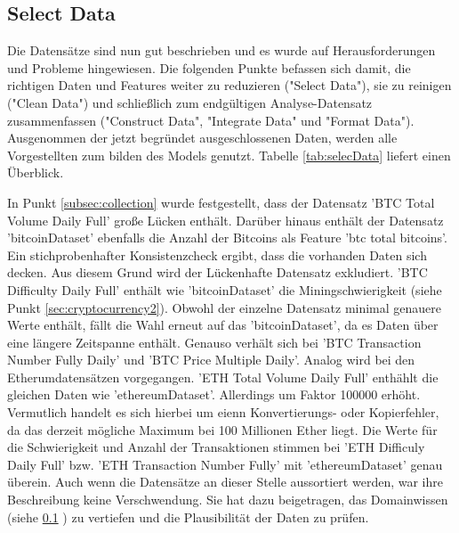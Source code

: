 \subsection{Select Data}
Die Datensätze sind nun gut beschrieben und es wurde auf Herausforderungen und Probleme hingewiesen. Die folgenden Punkte befassen sich damit, die richtigen Daten und Features weiter zu reduzieren ("Select Data"), sie zu reinigen ("Clean Data") und schließlich zum endgültigen Analyse-Datensatz zusammenfassen ("Construct Data", "Integrate Data" und "Format Data").
Ausgenommen der jetzt begründet ausgeschlossenen Daten, werden alle Vorgestellten zum bilden des Models genutzt. Tabelle \ref{tab:selecData} liefert einen Überblick.

In Punkt \ref{subsec:collection} wurde festgestellt, dass der Datensatz 'BTC \textunderscore Total \textunderscore Volume \textunderscore Daily \textunderscore Full' große Lücken enthält. Darüber hinaus enthält der Datensatz 'bitcoinDataset' ebenfalls die Anzahl der Bitcoins als Feature 'btc \textunderscore total \textunderscore bitcoins'. Ein stichprobenhafter Konsistenzcheck ergibt, dass die vorhanden Daten sich decken. Aus diesem Grund wird der Lückenhafte Datensatz exkludiert. 
'BTC \textunderscore Difficulty \textunderscore Daily \textunderscore Full' enthält wie 'bitcoinDataset' die Miningschwierigkeit (siehe Punkt \ref{sec:cryptocurrency2}). Obwohl der einzelne Datensatz minimal genauere Werte enthält, fällt die Wahl erneut auf das 'bitcoinDataset', da es Daten über eine längere Zeitspanne enthält. Genauso verhält sich bei 'BTC \textunderscore Transaction \textunderscore Number \textunderscore Fully \textunderscore Daily' und 'BTC \textunderscore Price \textunderscore Multiple \textunderscore Daily'. 
Analog wird bei den Etherumdatensätzen vorgegangen. 'ETH \textunderscore Total \textunderscore Volume \textunderscore Daily \textunderscore Full' enthählt die gleichen Daten wie 'ethereumDataset'. Allerdings um Faktor 100000 erhöht. Vermutlich handelt es sich hierbei um eienn Konvertierungs- oder Kopierfehler, da das derzeit mögliche Maximum bei 100 Millionen Ether liegt. Die Werte für die Schwierigkeit und Anzahl der Transaktionen stimmen bei 'ETH \textunderscore Difficuly \textunderscore Daily \textunderscore Full' bzw. 'ETH \textunderscore Transaction \textunderscore Number \textunderscore Fully' mit 'ethereumDataset' genau überein. 
Auch wenn die Datensätze an dieser Stelle aussortiert werden, war ihre Beschreibung keine Verschwendung. Sie hat dazu beigetragen, das Domainwissen (siehe \ref{} ) zu vertiefen und die Plausibilität der Daten zu prüfen.
